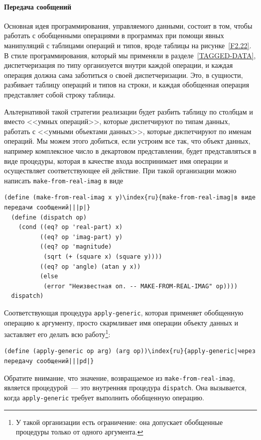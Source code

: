 \paragraph{Передача сообщений}


Основная идея программирования, управляемого данными,
состоит в том, чтобы работать с обобщенными операциями в программах
при помощи явных манипуляций с таблицами операций и типов, вроде
таблицы на рисунке~\ref{F2.22}.  В стиле программирования,
который мы применяли в разделе~\ref{TAGGED-DATA},
диспетчеризация по типу организуется внутри каждой операции, и каждая операция
должна сама заботиться о своей диспетчеризации.  Это, в сущности,
разбивает таблицу операций и типов на строки, и каждая
обобщенная операция представляет собой строку таблицы.

Альтернативой такой стратегии реализации будет разбить
таблицу по столбцам и вместо <<умных операций>>, которые диспетчируют по
типам данных, работать с <<умными объектами данных>>, которые
диспетчируют по именам операций.  Мы можем этого добиться, если
устроим все так, что объект данных, например комплексное число в
декартовом представлении, будет представляться в виде процедуры, которая в
качестве входа воспринимает имя операции и осуществляет
соответствующее ей действие.  При такой организации можно написать
{\tt make-from-real-imag} в виде

\begin{Verbatim}[fontsize=\small]
(define (make-from-real-imag x y)\index{ru}{make-from-real-imag|в виде передачи сообщений|||p|}
  (define (dispatch op)
    (cond ((eq? op 'real-part) x)
          ((eq? op 'imag-part) y)
          ((eq? op 'magnitude)
           (sqrt (+ (square x) (square y))))
          ((eq? op 'angle) (atan y x))
          (else
           (error "Неизвестная оп. -- MAKE-FROM-REAL-IMAG" op))))
  dispatch) 
\end{Verbatim}
Соответствующая процедура {\tt apply-generic}, которая
применяет обобщенную операцию к аргументу, просто скармливает имя
операции объекту данных и заставляет его делать всю работу\footnote{У такой организации есть ограничение: она допускает 
обобщенные процедуры только от одного аргумента.
}:

\begin{Verbatim}[fontsize=\small]
(define (apply-generic op arg) (arg op))\index{ru}{apply-generic|через передачу сообщений|||pd|}
\end{Verbatim}
Обратите внимание, что значение, возвращаемое из
{\tt make-from-real-imag}, является процедурой~--- это внутренняя
процедура {\tt dispatch}.  Она вызывается, когда
{\tt apply-generic} требует выполнить обобщенную операцию.

